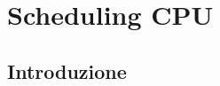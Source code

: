 \documentclass[a4paper]{article}
\begin{document}


\section{Scheduling CPU}
\subsection{Introduzione}
\end{document}
